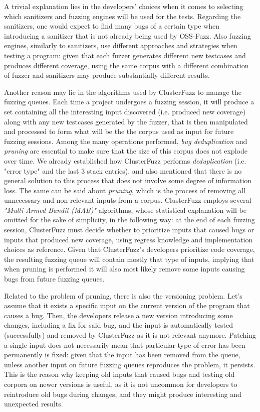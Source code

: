 A trivial explanation lies in the developers' choices when it comes to selecting which sanitizers and fuzzing engines will be used for the tests. Regarding the sanitizers, one would expect to find many bugs of a certain type when introducing a sanitizer that is not already being used by OSS-Fuzz. Also fuzzing engines, similarly to sanitizers, use different approaches and strategies when testing a program: given that each fuzzer generates different new testcases and produces different coverage, using the same corpus with a different combination of fuzzer and sanitizers may produce substantially different results. 

Another reason may lie in the algorithms used by ClusterFuzz to manage the fuzzing queues. Each time a project undergoes a fuzzing session, it will produce a set containing all the interesting input discovered (i.e. produced new coverage) along with any new testcases generated by the fuzzer, that is then manipulated and processed to form what will be the the corpus used as input for future fuzzing sessions. Among the many operations performed, \textit{bug deduplication} and \textit{pruning} are essential to make sure that the size of this corpus does not explode over time. We already established how ClusterFuzz performs \textit{deduplication} (i.e. "error type" and the last 3 stack entries), and also mentioned that there is no general solution to this process that does not involve some degree of information loss.
The same can be said about \textit{pruning}, which is the process of removing all unnecessary and non-relevant inputs from a corpus. ClusterFuzz employs several \textit{"Multi-Armed Bandit (MAB)"} \cite{mab} algorithms, whose statistical explanation will be omitted for the sake of simplicity, in the following way: at the end of each fuzzing session, ClusterFuzz must decide whether to prioritize inputs that caused bugs or inputs that produced new coverage, using regress knowledge and implementation choices as reference. Given that ClusterFuzz's developers prioritize code coverage, the resulting fuzzing queue will contain mostly that type of inputs, implying that when pruning is performed it will also most likely remove some inputs causing bugs from future fuzzing queues.

Related to the problem of pruning, there is also the versioning problem.
Let's assume that it exists a specific input on the current version of the program that causes a bug. Then, the developers release a new version introducing some changes, including a fix for said bug, and the input is automatically tested (successfully) and removed by ClusterFuzz as it is not relevant anymore. Patching a single input does not necessarily mean that particular type of error has been permanently is fixed: given that the input has been removed from the queue, unless another input on future fuzzing queues reproduces the problem, it persists. This is the reason why keeping old inputs that caused bugs and testing old corpora on newer versions is useful, as it is not uncommon for developers to reintroduce old bugs during changes, and they might produce interesting and unexpected results.

